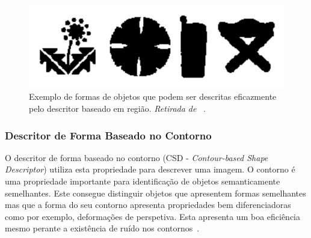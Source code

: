 \begin{figure}[h]
\centering
\includegraphics[width=0.7\linewidth]{./figures/shape1}
\caption{Exemplo de formas de objetos que podem ser descritas eficazmente pelo descritor baseado em região. \textit{Retirada de}~\cite{Bober2001} .}
\label{fig:shape1}
\end{figure}

%

\subsubsection{Descritor de Forma Baseado no Contorno}

O descritor de forma baseado no contorno (CSD - \textit{Contour-based Shape Descriptor}) utiliza esta propriedade para descrever uma imagem. O contorno é uma propriedade importante para identificação de objetos semanticamente semelhantes. Este consegue distinguir objetos que apresentem formas semelhantes mas que a forma do seu contorno apresenta propriedades bem diferenciadoras como por exemplo, deformações de perspetiva. Esta apresenta um boa eficiência mesmo perante a existência de ruído nos contornos~\cite{Bober2001}. 

%

